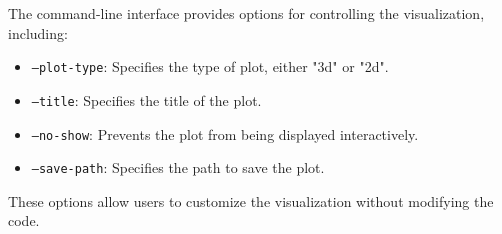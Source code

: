 The command-line interface provides options for controlling the visualization, including:

\begin{itemize}
    \item \texttt{--plot-type}: Specifies the type of plot, either "3d" or "2d".
    \item \texttt{--title}: Specifies the title of the plot.
    \item \texttt{--no-show}: Prevents the plot from being displayed interactively.
    \item \texttt{--save-path}: Specifies the path to save the plot.
\end{itemize}

These options allow users to customize the visualization without modifying the code.
